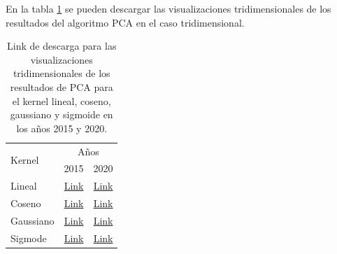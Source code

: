En la tabla \ref{table:pca_results} se pueden descargar las visualizaciones tridimensionales de los resultados del algoritmo PCA en el caso tridimensional.

\begin{table}[H]
	\centering
	\begin{tabular}{lrr} \hline
		\multirow{2}{*}{Kernel} & \multicolumn{2}{c}{Años}                                                                                                                                                                                                                                                    \\ \cline{2-3}
		                        & 2015                                                                                                                                 & 2020                                                                                                                                 \\ \hline
		Lineal                  & \href{https://github.com/giovannilopez9808/Reconocimiento_de_patrones_proyecto/raw/main/Graphics/Data_2015/PCA_3D_linear.mp4}{Link}  & \href{https://github.com/giovannilopez9808/Reconocimiento_de_patrones_proyecto/raw/main/Graphics/Data_2020/PCA_3D_linear.mp4}{Link}  \\
		Coseno                  & \href{https://github.com/giovannilopez9808/Reconocimiento_de_patrones_proyecto/raw/main/Graphics/Data_2015/PCA_3D_cosine.mp4}{Link}  & \href{https://github.com/giovannilopez9808/Reconocimiento_de_patrones_proyecto/raw/main/Graphics/Data_2020/PCA_3D_cosine.mp4}{Link}  \\
		Gaussiano               & \href{https://github.com/giovannilopez9808/Reconocimiento_de_patrones_proyecto/raw/main/Graphics/Data_2015/PCA_3D_rbf.mp4}{Link}     & \href{https://github.com/giovannilopez9808/Reconocimiento_de_patrones_proyecto/raw/main/Graphics/Data_2020/PCA_3D_rbf.mp4}{Link}     \\
		Sigmode                 & \href{https://github.com/giovannilopez9808/Reconocimiento_de_patrones_proyecto/raw/main/Graphics/Data_2015/PCA_3D_sigmoid.mp4}{Link} & \href{https://github.com/giovannilopez9808/Reconocimiento_de_patrones_proyecto/raw/main/Graphics/Data_2020/PCA_3D_sigmoid.mp4}{Link} \\ \hline
	\end{tabular}
	\caption{Link de descarga para las visualizaciones tridimensionales de los resultados de PCA para el kernel lineal, coseno, gaussiano y sigmoide en los años 2015 y 2020.}
	\label{table:pca_results}
\end{table}
